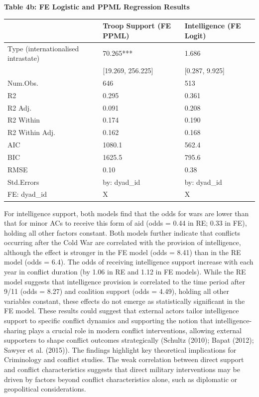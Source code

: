 \documentclass[
]{article}
\begin{document}
\noindent\textbf{Table 4b: FE Logistic and PPML Regression Results}

\begin{tabular}{lll}
\hline
& Troop Support (FE PPML) & Intelligence (FE Logit) \\ \hline
Type (internationalised intrastate) & \num{70.265}*** & \num{1.686} \\
& [\num{19.269}, \num{256.225}] & [\num{0.287}, \num{9.925}] \\
Num.Obs. & \num{646} & \num{513} \\
R2 & \num{0.295} & \num{0.361} \\
R2 Adj. & \num{0.091} & \num{0.208} \\
R2 Within & \num{0.174} & \num{0.190} \\
R2 Within Adj. & \num{0.162} & \num{0.168} \\
AIC & \num{1080.1} & \num{562.4} \\
BIC & \num{1625.5} & \num{795.6} \\
RMSE & \num{0.10} & \num{0.38} \\
Std.Errors & by: dyad\_id & by: dyad\_id \\
FE: dyad\_id & X & X \\
\hline
\end{tabular}

For intelligence support, both models find that the odds for wars are
lower than that for minor ACs to receive this form of aid (odds = 0.44
in RE; 0.33 in FE), holding all other factors constant. Both models
further indicate that conflicts occurring after the Cold War are
correlated with the provision of intelligence, although the effect is
stronger in the FE model (odds = 8.41) than in the RE model (odds =
6.4). The odds of receiving intelligence support increase with each year
in conflict duration (by 1.06 in RE and 1.12 in FE models). While the RE
model suggests that intelligence provision is correlated to the time
period after 9/11 (odds = 8.27) and coalition support (odds = 4.49),
holding all other variables constant, these effects do not emerge as
statistically significant in the FE model. These results could suggest
that external actors tailor intelligence support to specific conflict
dynamics and supporting the notion that intelligence-sharing plays a
crucial role in modern conflict interventions, allowing external
supporters to shape conflict outcomes strategically (Schultz (2010);
Bapat (2012); Sawyer et al. (2015)). The findings highlight key
theoretical implications for Criminology and conflict studies. The weak
correlation between direct support and conflict characteristics suggests
that direct military interventions may be driven by factors beyond
conflict characteristics alone, such as diplomatic or geopolitical
considerations.
\end{document}
